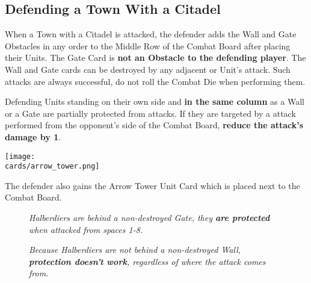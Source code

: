 \begin{multicols}{2}

\subsection*{\hypertarget{Walls}{Defending a Town With a Citadel}}

When a Town with a Citadel is attacked, the defender adds the Wall and Gate Obstacles in any order to the Middle Row of the Combat Board after placing their Units.
The Gate Card is \textbf{not an Obstacle to the defending player}.
The Wall and Gate cards can be destroyed by any adjacent  or  Unit's attack.
Such attacks are always successful, do not roll the Combat Die when performing them.\par

Defending Units standing on their own side and \textbf{in the same column} as a Wall or a Gate are partially protected from  attacks.
If they are targeted by a  attack performed from the opponent's side of the Combat Board, \textbf{reduce the attack's damage by 1}.

\begin{center}
  \texttt{[image: \\cards/arrow\_tower.png]}
\end{center}
The defender also gains the Arrow Tower Unit Card which is placed next to the Combat Board.

\end{multicols}

\vspace*{\fill}

\begin{figure*}[!hb]
  \mbox{}%
  \hfill%
  \begin{minipage}[t]{0.4\textwidth}
    \centering
  \caption[halberdiers protected]{\textit{Halberdiers are behind a non-destroyed Gate, they \textbf{are protected} when attacked from spaces 1-8.}}
  \end{minipage}
  \hfill%
  \begin{minipage}[t]{0.4\textwidth}
    \centering
  \caption[halberdiers unprotected]{\textit{Because Halberdiers are not behind a non-destroyed Wall, \textbf{protection doesn't work}, regardless of where the  attack comes from.}}
  \end{minipage}
  \hfill%
  \mbox{}%
\end{figure*}

